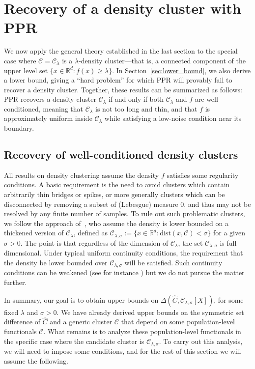 \documentclass[11pt,twoside]{article}
\theoremstyle{definition}
\newcommand{\Reals}{\mathbb{R}}
\newcommand{\1}{\mathbf{1}}
\newcommand{\Rd}{\Reals^d}
\newcommand{\mc}[1]{\mathcal{#1}}
\newcommand{\wh}[1]{\widehat{#1}}
\newcommand{\dist}{\mathrm{dist}}
\begin{document}
\section{Recovery of a density cluster with PPR}
\label{sec:ppr_density_cluster}
We now apply the general theory established in the last section to the special case where $\mc{C} = \mc{C}_{\lambda}$ is a $\lambda$-density cluster---that is, a connected component of the upper level set $\{x \in \Rd: f(x) \geq \lambda\}$. In Section~\ref{sec:lower_bound}, we also derive a lower bound, giving a ``hard problem'' for which PPR will provably fail to recover a density cluster. Together, these results can be summarized as follows: PPR recovers a density cluster $\mc{C}_{\lambda}$ if and only if both $\mc{C}_{\lambda}$ and $f$ are well-conditioned, meaning that $\mc{C}_{\lambda}$ is not too long and thin, and that $f$ is approximately uniform inside $\mc{C}_{\lambda}$ while satisfying a low-noise condition near its boundary.

\subsection{Recovery of well-conditioned density clusters}
\label{subsec:recovery_well-conditioned_density_clusters}

All results on density clustering assume the density $f$ satisfies some regularity conditions. A basic requirement is the need to avoid clusters which contain arbitrarily thin bridges or spikes, or more generally clusters which can be disconnected by removing a subset of (Lebesgue) measure $0$, and thus may not be resolved by any finite number of samples. To rule out such problematic clusters, we follow the approach of~\cite{chaudhuri2010}, who assume the density is lower bounded on a thickened version of $\mc{C}_{\lambda}$, defined as $\mc{C}_{\lambda,\sigma} := \{x \in \Reals^d: \dist(x,\mc{C}) < \sigma\}$ for a given $\sigma > 0$. The point is that regardless of the dimension of $\mc{C}_{\lambda}$, the set $\mc{C}_{\lambda,\sigma}$ is full dimensional. Under typical uniform continuity conditions, the requirement that the density be lower bounded over $\mc{C}_{\lambda,\sigma}$ will be satisfied. Such continuity conditions can be weakened (see for instance \citet{rinaldo2010,steinwart2015}) but we do not pursue the matter further.

In summary, our goal is to obtain upper bounds on $\Delta(\wh{C},\mc{C}_{\lambda,\sigma}[X])$, for some fixed $\lambda$ and $\sigma > 0$. We have already derived upper bounds on the symmetric set difference of $\wh{C}$ and a generic cluster $\mc{C}$ that depend on some population-level functionals $\mc{C}$. What remains is to analyze these population-level functionals in the specific case where the candidate cluster is $\mc{C}_{\lambda,\sigma}$. To carry out this analysis, we will need to impose some conditions, and for the rest of this section we will assume the following.
\end{document}
